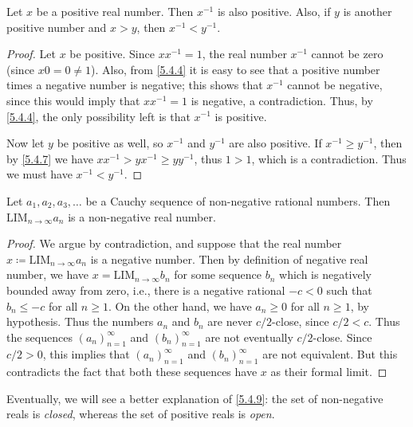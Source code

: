 \begin{prop}\label{5.4.8}
  Let \(x\) be a positive real number.
  Then \(x^{-1}\) is also positive.
  Also, if \(y\) is another positive number and \(x > y\), then \(x^{-1} < y^{-1}\).
\end{prop}

\begin{proof}
  Let \(x\) be positive.
  Since \(xx^{-1} = 1\), the real number \(x^{-1}\) cannot be zero (since \(x0 = 0 \neq 1\)).
  Also, from \cref{5.4.4} it is easy to see that a positive number times a negative number is negative;
  this shows that \(x^{-1}\) cannot be negative, since this would imply that \(xx^{-1} = 1\) is negative, a contradiction.
  Thus, by \cref{5.4.4}, the only possibility left is that \(x^{-1}\) is positive.

  Now let \(y\) be positive as well, so \(x^{-1}\) and \(y^{-1}\) are also positive.
  If \(x^{-1} \geq y^{-1}\), then by \cref{5.4.7} we have \(xx^{-1} > yx^{-1} \geq yy^{-1}\), thus \(1 > 1\), which is a contradiction.
  Thus we must have \(x^{-1} < y^{-1}\).
\end{proof}

\begin{prop}\label{5.4.9}
  Let \(a_1, a_2, a_3, \dots\) be a Cauchy sequence of non-negative rational numbers.
  Then \(\text{LIM}_{n \to \infty} a_n\) is a non-negative real number.
\end{prop}

\begin{proof}
  We argue by contradiction, and suppose that the real number \(x \coloneqq \text{LIM}_{n \to \infty} a_n\) is a negative number.
  Then by definition of negative real number, we have \(x = \text{LIM}_{n \to \infty} b_n\) for some sequence \(b_n\) which is negatively bounded away from zero, i.e., there is a negative rational \(-c < 0\) such that \(b_n \leq -c\) for all \(n \geq 1\).
  On the other hand, we have \(a_n \geq 0\) for all \(n \geq 1\), by hypothesis.
  Thus the numbers \(a_n\) and \(b_n\) are never \(c / 2\)-close, since \(c / 2 < c\).
  Thus the sequences \((a_n)_{n = 1}^{\infty}\) and \((b_n)_{n = 1}^{\infty}\) are not eventually \(c / 2\)-close.
  Since \(c / 2 > 0\), this implies that \((a_n)_{n = 1}^{\infty}\) and \((b_n)_{n = 1}^{\infty}\) are not equivalent.
  But this contradicts the fact that both these sequences have \(x\) as their formal limit.
\end{proof}

\begin{note}
  Eventually, we will see a better explanation of \cref{5.4.9}:
  the set of non-negative reals is \emph{closed}, whereas the set of positive reals is \emph{open}.
\end{note}

